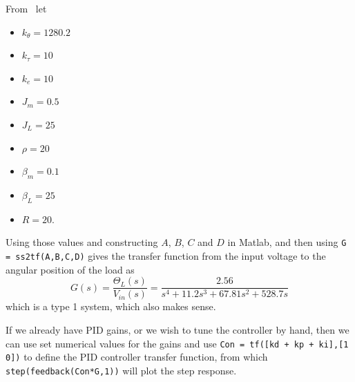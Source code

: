 From~\cite{YQChenAcc} let 
\begin{itemize}
  \item $k_\theta = 1280.2$
  \item $k_\tau = 10$
  \item $k_e = 10$ 
  \item $J_m = 0.5$ 
  \item $J_L = 25$
  \item $\rho = 20$
  \item $\beta_m = 0.1$
  \item $\beta_L = 25$
  \item $R = 20$.
\end{itemize}
Using those values and constructing $A$, $B$, $C$ and $D$ in Matlab, and then using \texttt{G = ss2tf(A,B,C,D)} gives the transfer function from the input voltage to the angular position of the load as
\begin{equation*}
  G(s) = \frac{\Theta_L(s)}{V_{in}(s)} = \frac{2.56}{s^4 + 11.2 s^3 + 67.81 s^2 + 528.7 s}
\end{equation*}
which is a type 1 system, which also makes sense.

If we already have PID gains, or we wish to tune the controller by hand, then we can use set numerical values for the gains and use \texttt{Con = tf([kd + kp + ki],[1 0])} to define the PID controller transfer function, from which \texttt{step(feedback(Con*G,1))} will plot the step response. 

